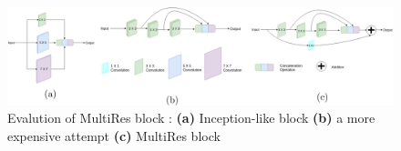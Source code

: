 \begin{figure}
    \centerline{\includegraphics[width=1\columnwidth]{04-methodology/figures/multiresunet-multiresblock-steps.jpg}}
    \caption{Evalution of MultiRes block : \textbf{(a)} Inception-like block \textbf{(b)} a more expensive attempt \textbf{(c)} MultiRes block \cite{ibtehaz2020multiresunet}}
    \label{fig:multiresunet-multiresblock-steps}
\end{figure}